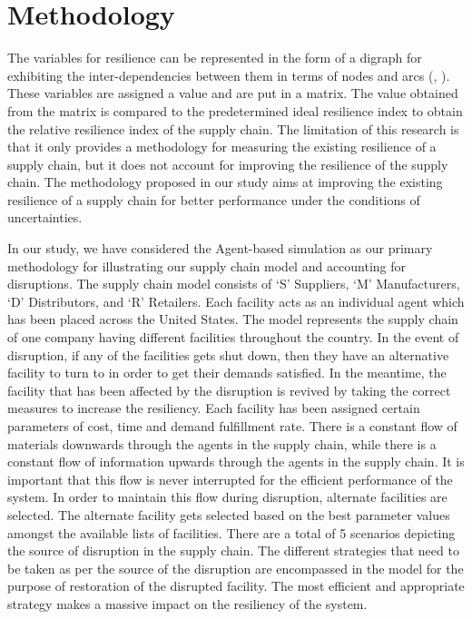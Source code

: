 \chapter{Methodology}\label{ch:methodology}

The variables for resilience can be represented in the form of a digraph for exhibiting the inter-dependencies between them in terms of nodes and arcs (\citeauthor{soni2014measuring}, \citeyear{soni2014measuring}). These variables are assigned a value and are put in a matrix. The value obtained from the matrix is compared to the predetermined ideal resilience index to obtain the relative resilience index of the supply chain. The limitation of this research is that it only provides a methodology for measuring the existing resilience of a supply chain, but it does not account for improving the resilience of the supply chain. The methodology proposed in our study aims at improving the existing resilience of a supply chain for better performance under the conditions of uncertainties. 

In our study, we have considered the Agent-based simulation as our primary methodology for illustrating our supply chain model and accounting for disruptions. The supply chain model consists of `S' Suppliers, `M' Manufacturers, `D' Distributors, and `R' Retailers. Each facility acts as an individual agent which has been placed across the United States. The model represents the supply chain of one company having different facilities throughout the country. In the event of disruption, if any of the facilities gets shut down, then they have an alternative facility to turn to in order to get their demands satisfied. In the meantime, the facility that has been affected by the disruption is revived by taking the correct measures to increase the resiliency. Each facility has been assigned certain parameters of cost, time and demand fulfillment rate. There is a constant flow of materials downwards through the agents in the supply chain, while there is a constant flow of information upwards through the agents in the supply chain. It is important that this flow is never interrupted for the efficient performance of the system. In order to maintain this flow during disruption, alternate facilities are selected. The alternate facility gets selected based on the best parameter values amongst the available lists of facilities. There are a total of 5 scenarios depicting the source of disruption in the supply chain. The different strategies that need to be taken as per the source of the disruption are encompassed in the model for the purpose of restoration of the disrupted facility. The most efficient and appropriate strategy makes a massive impact on the resiliency of the system.

